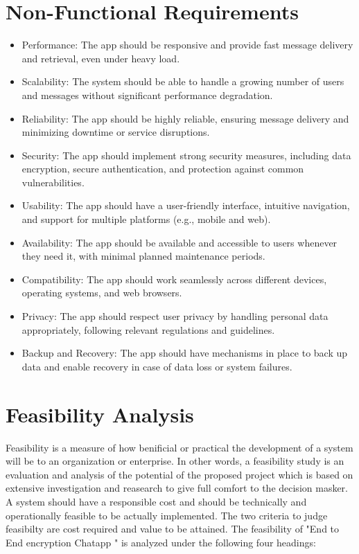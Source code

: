 \section{Non-Functional Requirements}
\vspace{-18pt}
\begin{itemize}
	\item Performance: The app should be responsive and provide fast message delivery and retrieval, even under heavy load.
	\item Scalability: The system should be able to handle a growing number of users and messages without significant performance degradation.
	\item Reliability: The app should be highly reliable, ensuring message delivery and minimizing downtime or service disruptions.
	\item Security: The app should implement strong security measures, including data encryption, secure authentication, and protection against common vulnerabilities.
	\item Usability: The app should have a user-friendly interface, intuitive navigation, and support for multiple platforms (e.g., mobile and web).
	\item Availability: The app should be available and accessible to users whenever they need it, with minimal planned maintenance periods.
	\item Compatibility: The app should work seamlessly across different devices, operating systems, and web browsers.
	\item Privacy: The app should respect user privacy by handling personal data appropriately, following relevant regulations and guidelines.
	\item Backup and Recovery: The app should have mechanisms in place to back up data and enable recovery in case of data loss or system failures.
\end{itemize}

\section{Feasibility Analysis}
Feasibility is a measure of how benificial or practical the development of a system will be to an organization or enterprise.
In other words, a feasibility study is an evaluation and analysis of the potential of the proposed project which is based on extensive investigation and reasearch to give
full comfort to the decision masker. A system should have a responsible cost and should be technically and operationally feasible to be actually implemented.
The two criteria to judge feasibilty are cost required and value to be attained. The feasibility of "End to End encryption Chatapp " is analyzed under the following four headings:

